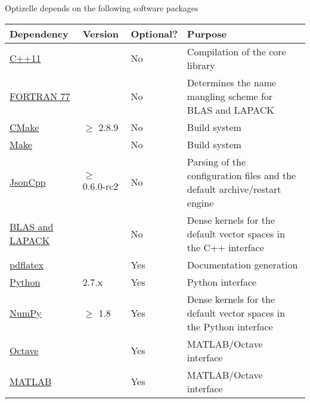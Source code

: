 \documentclass{report}
\begin{document}
        Optizelle depends on the following software packages
\begin{center}\begin{tabular}{|l|l|l|p{}|}\hline
{\bf Dependency} & {\bf Version} & {\bf Optional?} & {\bf Purpose} \\\hline
\hyperref[tbl:compilers]{C++11} & & No & Compilation of the core library\\\hline
\hyperref[tbl:compilers]{FORTRAN 77} & & No & Determines the name mangling scheme for BLAS and LAPACK\\\hline
\href{http://cmake.org}{CMake} & $\geq$ 2.8.9 & No & Build system\\\hline
\hyperref[tbl:make]{Make} & & No & Build system\\\hline
\href{http://jsoncpp.sourceforge.net}{JsonCpp} & $\geq$ 0.6.0-rc2 & No & Parsing of the configuration files and the default archive/restart engine\\\hline
\hyperref[tbl:blaslapack]{BLAS and LAPACK} & & No & Dense kernels for the default vector spaces in the C++ interface\\\hline
\href{http://www.ctan.org}{pdflatex} & & Yes & Documentation generation \\\hline
\href{http://python.org}{Python} & 2.7.x & Yes & Python interface \\\hline
\href{http://www.numpy.org}{NumPy} & $\geq$ 1.8 & Yes & Dense kernels for the default vector spaces in the Python interface\\\hline
\href{https://www.gnu.org/software/octave}{Octave} & & Yes & MATLAB/Octave interface\\\hline
\href{http://www.mathworks.com/products/matlab}{MATLAB} & & Yes & MATLAB/Octave interface\\\hline
\end{tabular}\end{center}
\end{document}
